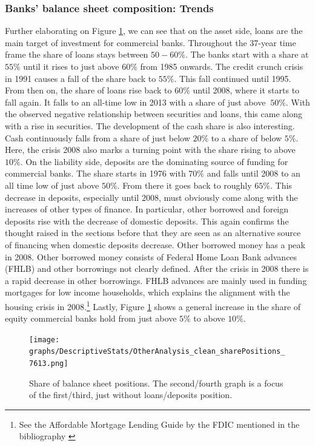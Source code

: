 \documentclass[12pt, a4paper]{article} %
\begin{document}
\subsubsection{Banks' balance sheet composition: Trends}
\label{sec:shareBalanceSheetAccounts}
Further elaborating on Figure \ref{fig:share_both}, we can see that on the asset side, loans are the main target of investment for commercial banks. Throughout the 37-year time frame the share of loans stays between $50-60\%$. The banks start with a share at $55\%$ until it rises to just above $60\%$ from 1985 onwards. The credit crunch crisis in 1991 causes a fall of the share back to $55\%$. This fall continued until 1995. From then on, the share of loans rise back to $60\%$ until 2008, where it starts to fall again. It falls to an all-time low in 2013 with a share of just above $~50\%$. With the observed negative relationship between securities and loans, this came along with a rise in securities. 
The development of the cash share is also interesting. Cash continuously falls from a share of just below $20\%$ to a share of below $5\%$. Here, the crisis 2008 also marks a turning point with the share rising to above $10\%$.
On the liability side, deposits are the dominating source of funding for commercial banks. The share starts in 1976 with $70\%$ and falls until 2008 to an all time low of just above $50\%$. From there it goes back to roughly $65\%$. This decrease in deposits, especially until 2008, must obviously come along with the increases of other types of finance. In particular, other borrowed and foreign deposits rise with the decrease of domestic deposits. This again confirms the thought raised in the sections before that they are seen as an alternative source of financing when domestic deposits decrease.
Other borrowed money has a peak in 2008. Other borrowed money consists of Federal Home Loan Bank advances (FHLB) and other borrowings not clearly defined. After the crisis in 2008 there is a rapid decrease in other borrowings. FHLB advances are mainly used in funding mortgages for low income households, which explains the alignment with the housing crisis in 2008.\footnote{See the Affordable Mortgage Lending Guide by the FDIC mentioned in the bibliography \citet{FHLB}} Lastly, Figure \ref{fig:share_both} shows a general increase in the share of equity commercial banks hold from just above $5\%$ to above $10\%$. 

\begin{figure}[H]
\begin{minipage}{\textwidth}
\texttt{[image: graphs/DescriptiveStats/OtherAnalysis\_clean\_sharePositions\_7613.png]}
\caption[1]{Share of balance sheet positions. The second/fourth graph is a focus of the first/third, just without loans/deposits position. }
\label{fig:share_both}
\end{minipage}
\end{figure}
 
\end{document}
